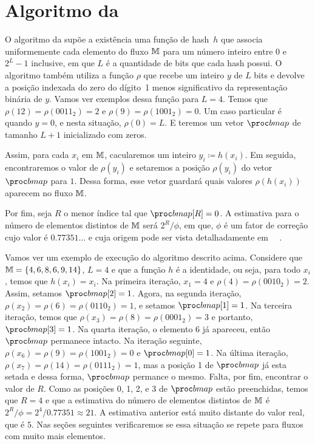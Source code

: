 \section{Algoritmo da }
\label{sec:flajolet-martin:algorithm}

O algoritmo da  supõe a existência uma função de hash~$h$ que associa uniformemente cada 
elemento do fluxo $\mathbb{M}$ para um número inteiro entre $0$ e $2^L-1$ inclusive, em que $L$ é a quantidade de bits que 
cada hash possui. O algoritmo também utiliza a função $\rho$ que recebe um inteiro $y$ de $L$ bits e devolve a posição 
indexada do zero do dígito~1 menos significativo da representação binária de $y$. Vamos ver exemplos dessa função para 
$L = 4$. Temos que $\rho(12) = \rho(0011_2) = 2$ e $\rho(9) = \rho(1001_2) = 0$. Um caso particular é quando $y = 0$, e 
nesta situação, $\rho(0) = L$. E teremos um vetor $\bitmap$ de tamanho $L + 1$ inicializado com zeros.

Assim, para cada $x_i$ em $\mathbb{M}$, cacularemos um inteiro $y_i \coloneqq h(x_i)$. Em seguida, encontraremos o valor de 
$\rho(y_i)$ e setaremos a posição $\rho(y_i)$ do vetor $\bitmap$ para $1$. Dessa forma, esse vetor guardará quais valores 
$\rho(h(x_i))$ aparecem no fluxo $\mathbb{M}$.

Por fim, seja $R$ o menor índice tal que $\bitmap[R] = 0$. A estimativa para o número de elementos distintos de 
$\mathbb{M}$ será $2^R/\phi$, em que, $\phi$ é um fator de correção cujo valor é $0.77351{\dots}$ e cuja origem pode ser vista
detalhadamente em ~~\citep{flajolet:martin:85}.

Vamos ver um exemplo de execução do algoritmo descrito acima. Considere que $\mathbb{M} = \{ 4, 6, 8, 6, 9, 14 \}$, $L = 4$ e
que a função $h$ é a identidade, ou seja, para todo $x_i$, temos que $h(x_i) = x_i$. Na primeira iteração, $x_1 = 4$ e 
$\rho(4) = \rho(0010_2) = 2$. Assim, setamos $\bitmap[2] = 1$. Agora, na segunda iteração, 
$\rho(x_2) = \rho(6) = \rho(0110_2) = 1$, e setamos $\bitmap[1] = 1$. Na terceira iteração, temos que 
$\rho(x_3) = \rho(8) = \rho(0001_2) = 3$ e portanto, $\bitmap[3] = 1$. Na quarta iteração, o elemento $6$ já apareceu, 
então $\bitmap$ permanece intacto. Na iteração seguinte, $\rho(x_6) = \rho(9) = \rho(1001_2) = 0$ e $\bitmap[0] = 1$.
Na última iteração, $\rho(x_7) = \rho(14) = \rho(0111_2) = 1$, mas a posição 1 de $\bitmap$ já esta setada e dessa forma,
$\bitmap$ permance o mesmo. Falta, por fim, encontrar o valor de $R$. Como as posições 0, 1, 2, e 3 de $\bitmap$ estão
preenchidas, temos que $R = 4$ e que a estimativa do número de elementos distintos de $\mathbb{M}$ é 
$2^{R}/\phi = 2^4/0.77351 \approx 21$. A estimativa anterior está muito distante do valor real, que é $5$. Nas seções
seguintes verificaremos se essa situação se repete para fluxos com muito mais elementos.

